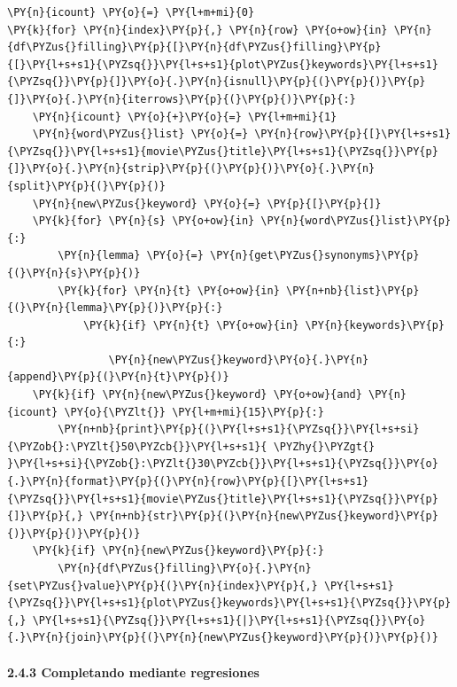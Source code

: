     \begin{tcolorbox}[breakable, size=fbox, boxrule=1pt, pad at break*=1mm,colback=cellbackground, colframe=cellborder]
\begin{Verbatim}[commandchars=\\\{\}]
\PY{n}{icount} \PY{o}{=} \PY{l+m+mi}{0}
\PY{k}{for} \PY{n}{index}\PY{p}{,} \PY{n}{row} \PY{o+ow}{in} \PY{n}{df\PYZus{}filling}\PY{p}{[}\PY{n}{df\PYZus{}filling}\PY{p}{[}\PY{l+s+s1}{\PYZsq{}}\PY{l+s+s1}{plot\PYZus{}keywords}\PY{l+s+s1}{\PYZsq{}}\PY{p}{]}\PY{o}{.}\PY{n}{isnull}\PY{p}{(}\PY{p}{)}\PY{p}{]}\PY{o}{.}\PY{n}{iterrows}\PY{p}{(}\PY{p}{)}\PY{p}{:}
    \PY{n}{icount} \PY{o}{+}\PY{o}{=} \PY{l+m+mi}{1}
    \PY{n}{word\PYZus{}list} \PY{o}{=} \PY{n}{row}\PY{p}{[}\PY{l+s+s1}{\PYZsq{}}\PY{l+s+s1}{movie\PYZus{}title}\PY{l+s+s1}{\PYZsq{}}\PY{p}{]}\PY{o}{.}\PY{n}{strip}\PY{p}{(}\PY{p}{)}\PY{o}{.}\PY{n}{split}\PY{p}{(}\PY{p}{)}
    \PY{n}{new\PYZus{}keyword} \PY{o}{=} \PY{p}{[}\PY{p}{]}
    \PY{k}{for} \PY{n}{s} \PY{o+ow}{in} \PY{n}{word\PYZus{}list}\PY{p}{:}
        \PY{n}{lemma} \PY{o}{=} \PY{n}{get\PYZus{}synonyms}\PY{p}{(}\PY{n}{s}\PY{p}{)}
        \PY{k}{for} \PY{n}{t} \PY{o+ow}{in} \PY{n+nb}{list}\PY{p}{(}\PY{n}{lemma}\PY{p}{)}\PY{p}{:}
            \PY{k}{if} \PY{n}{t} \PY{o+ow}{in} \PY{n}{keywords}\PY{p}{:} 
                \PY{n}{new\PYZus{}keyword}\PY{o}{.}\PY{n}{append}\PY{p}{(}\PY{n}{t}\PY{p}{)}                
    \PY{k}{if} \PY{n}{new\PYZus{}keyword} \PY{o+ow}{and} \PY{n}{icount} \PY{o}{\PYZlt{}} \PY{l+m+mi}{15}\PY{p}{:} 
        \PY{n+nb}{print}\PY{p}{(}\PY{l+s+s1}{\PYZsq{}}\PY{l+s+si}{\PYZob{}:\PYZlt{}50\PYZcb{}}\PY{l+s+s1}{ \PYZhy{}\PYZgt{} }\PY{l+s+si}{\PYZob{}:\PYZlt{}30\PYZcb{}}\PY{l+s+s1}{\PYZsq{}}\PY{o}{.}\PY{n}{format}\PY{p}{(}\PY{n}{row}\PY{p}{[}\PY{l+s+s1}{\PYZsq{}}\PY{l+s+s1}{movie\PYZus{}title}\PY{l+s+s1}{\PYZsq{}}\PY{p}{]}\PY{p}{,} \PY{n+nb}{str}\PY{p}{(}\PY{n}{new\PYZus{}keyword}\PY{p}{)}\PY{p}{)}\PY{p}{)}
    \PY{k}{if} \PY{n}{new\PYZus{}keyword}\PY{p}{:}
        \PY{n}{df\PYZus{}filling}\PY{o}{.}\PY{n}{set\PYZus{}value}\PY{p}{(}\PY{n}{index}\PY{p}{,} \PY{l+s+s1}{\PYZsq{}}\PY{l+s+s1}{plot\PYZus{}keywords}\PY{l+s+s1}{\PYZsq{}}\PY{p}{,} \PY{l+s+s1}{\PYZsq{}}\PY{l+s+s1}{|}\PY{l+s+s1}{\PYZsq{}}\PY{o}{.}\PY{n}{join}\PY{p}{(}\PY{n}{new\PYZus{}keyword}\PY{p}{)}\PY{p}{)} 
\end{Verbatim}
\end{tcolorbox}

    \paragraph{2.4.3 Completando mediante
regresiones}\label{completando-mediante-regresiones}

